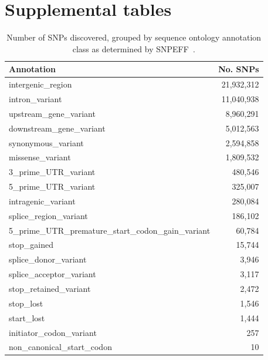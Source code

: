 \documentclass[a4paper,11pt,abstracton,hidelinks]{scrartcl}
\begin{document}
\section{Supplemental tables}\label{sec:supplemental-tables}


\begin{table}[h]
\begin{center}
\begin{threeparttable}

\caption{Number of SNPs discovered, grouped by sequence ontology annotation class as determined by SNPEFF~\parencite{Cingolani2012}.}

\label{table:snpeff}

\begin{tabular}{lr}
 \hline
 \textbf{Annotation} & \textbf{No. SNPs} \\
 \hline
intergenic\_region & 21,932,312 \\
intron\_variant & 11,040,938 \\
upstream\_gene\_variant & 8,960,291 \\
downstream\_gene\_variant & 5,012,563 \\
synonymous\_variant & 2,594,858 \\
missense\_variant & 1,809,532 \\
3\_prime\_UTR\_variant & 480,546 \\
5\_prime\_UTR\_variant & 325,007 \\
intragenic\_variant & 280,084 \\
splice\_region\_variant & 186,102 \\
5\_prime\_UTR\_premature\_start\_codon\_gain\_variant & 60,784 \\
stop\_gained & 15,744 \\
splice\_donor\_variant & 3,946 \\
splice\_acceptor\_variant & 3,117 \\
stop\_retained\_variant & 2,472 \\
stop\_lost & 1,546 \\
start\_lost & 1,444 \\
initiator\_codon\_variant & 257 \\
non\_canonical\_start\_codon & 10 \\
 \hline
\end{tabular}

\end{threeparttable}
\end{center}
\end{table}
\end{document}
